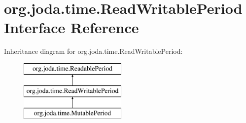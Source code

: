 \hypertarget{interfaceorg_1_1joda_1_1time_1_1_read_writable_period}{\section{org.\-joda.\-time.\-Read\-Writable\-Period Interface Reference}
\label{interfaceorg_1_1joda_1_1time_1_1_read_writable_period}
}
Inheritance diagram for org.\-joda.\-time.\-Read\-Writable\-Period\-:\begin{figure}[H]
\begin{center}
\leavevmode
\includegraphics[height=3.000000cm]{interfaceorg_1_1joda_1_1time_1_1_read_writable_period}
\end{center}
\end{figure}
